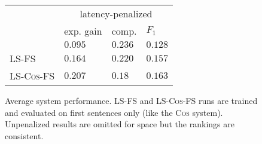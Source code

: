 \begin{figure}
  \center
  \begin{tabular}{ l | l l l |}
    &\multicolumn{3}{c}{latency-penalized}\\
    & exp. gain     & comp. & $F_1$ \\
    \hline
    \small \modelCos{}  & $0.095$ & $\mathbf{0.236}$ & $0.128$ \\
    \small \textsc{LS-FS}  & $0.164$ & $0.220$ & $0.157$ \\
    \small \textsc{LS-Cos-FS} & 
      $\mathbf{0.207}$ & $0.18~~$ & $\mathbf{0.163}$ \\
  \end{tabular}
  \caption{Average system performance. \textsc{LS-FS} and \textsc{LS-Cos-FS} 
           runs are trained and evaluated on first sentences only (like the 
           \textsc{Cos} system). Unpenalized results are omitted for space but
           the rankings are consistent.}
  \label{fig:lsfsresults}
\end{figure}


